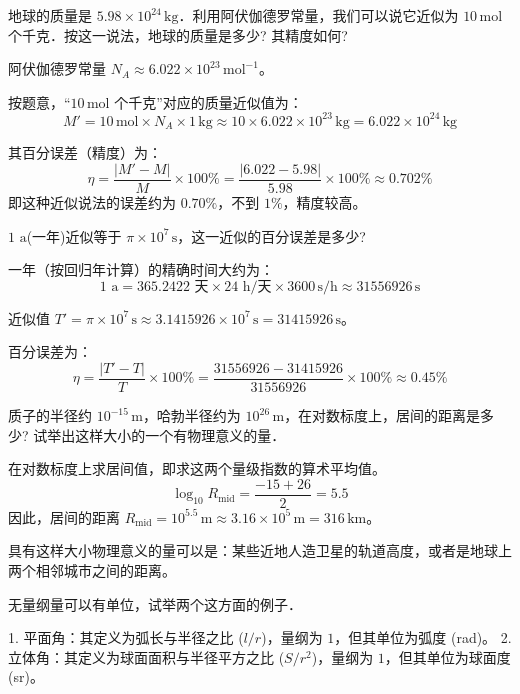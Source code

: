 \begin{exercise}\label{ex:1.3}
地球的质量是 $5.98 \times 10^{24}\,\mathrm{kg}$．利用阿伏伽德罗常量，我们可以说它近似为 $10\,\mathrm{mol}$ 个千克．按这一说法，地球的质量是多少? 其精度如何?
\end{exercise}
\begin{solution}
阿伏伽德罗常量 $N_A \approx 6.022 \times 10^{23}\,\mathrm{mol}^{-1}$。

按题意，“$10\,\mathrm{mol}$ 个千克”对应的质量近似值为：
$$ M' = 10\,\mathrm{mol} \times N_A \times 1\,\mathrm{kg} \approx 10 \times 6.022 \times 10^{23}\,\mathrm{kg} = 6.022 \times 10^{24}\,\mathrm{kg} $$

其百分误差（精度）为：
$$ \eta = \frac{|M' - M|}{M} \times 100\% = \frac{|6.022 - 5.98|}{5.98} \times 100\% \approx 0.702\% $$
即这种近似说法的误差约为 $0.70\%$，不到 $1\%$，精度较高。
\end{solution}

\begin{exercise}\label{ex:1.4}
$1\text{ a}$(一年)近似等于 $\pi \times 10^7\,\mathrm{s}$，这一近似的百分误差是多少?
\end{exercise}
\begin{solution}
一年（按回归年计算）的精确时间大约为：
$$ 1\text{ a} = 365.2422\text{ 天} \times 24\text{ h/天} \times 3600\,\mathrm{s/h} \approx 31556926\,\mathrm{s} $$

近似值 $T' = \pi \times 10^7\,\mathrm{s} \approx 3.1415926 \times 10^7\,\mathrm{s} = 31415926\,\mathrm{s}$。

百分误差为：
$$ \eta = \frac{|T' - T|}{T} \times 100\% = \frac{31556926 - 31415926}{31556926} \times 100\% \approx 0.45\% $$
\end{solution}

\begin{exercise}\label{ex:1.5}
质子的半径约 $10^{-15}\,\mathrm{m}$，哈勃半径约为 $10^{26}\,\mathrm{m}$，在对数标度上，居间的距离是多少? 试举出这样大小的一个有物理意义的量．
\end{exercise}
\begin{solution}
在对数标度上求居间值，即求这两个量级指数的算术平均值。
$$ \log_{10} R_{\text{mid}} = \frac{-15 + 26}{2} = 5.5 $$
因此，居间的距离 $R_{\text{mid}} = 10^{5.5}\,\mathrm{m} \approx 3.16 \times 10^5\,\mathrm{m} = 316\,\mathrm{km}$。

具有这样大小物理意义的量可以是：某些近地人造卫星的轨道高度，或者是地球上两个相邻城市之间的距离。
\end{solution}

\begin{exercise}\label{ex:1.6}
无量纲量可以有单位，试举两个这方面的例子．
\end{exercise}
\begin{solution}
1. 平面角：其定义为弧长与半径之比 ($l/r$)，量纲为 $1$，但其单位为弧度 (rad)。
2. 立体角：其定义为球面面积与半径平方之比 ($S/r^2$)，量纲为 $1$，但其单位为球面度 (sr)。
\end{solution}

